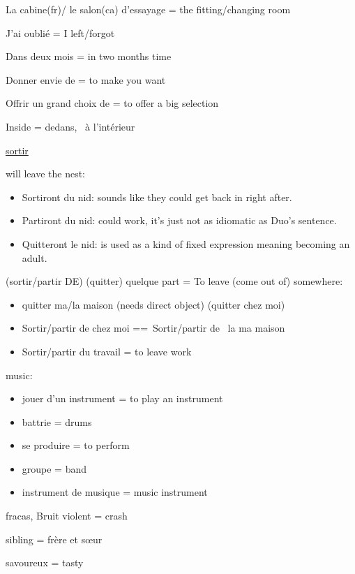 La cabine(fr)/ le salon(ca) d'essayage = the fitting/changing room~

J'ai oublié = I left/forgot~

Dans deux mois = in two months time

Donner envie de = to make you want~

Offrir un grand choix de = to offer a big selection~

Inside = dedans,~ à l'intérieur~

\href{https://www.larousse.fr/dictionnaires/francais/sortir/73545}{sortir}

will leave the nest:

\begin{itemize}
\item
  {Sortiront} du nid: sounds like they {could get back in right after}.
\item
  {Partiront} du nid: could work, it's just not as idiomatic as Duo's
  sentence.
\item
  {Quitteront} le nid: is used as a kind of fixed expression meaning
  {becoming an adult}.
\end{itemize}

{(sortir/partir DE) (quitter)} {quelque part = To leave (come out of)
somewhere:}

\begin{itemize}
\item
  {quitter ma/la maison} {(needs direct object}{) (}{quitter} {chez
  moi}{)}
\item
  {Sortir/partir de chez moi ==~}{Sortir/partir de~} {la} {ma} {maison}
\item
  {Sortir/partir du travail = to leave work~}
\end{itemize}

{music:}

\begin{itemize}
\item
  {jouer d'un instrument = to play an instrument}
\item
  {battrie = drums}
\item
  {se produire = to perform}
\item
  {groupe = band}
\item
  {instrument de musique = music instrument}
\end{itemize}

{fracas, Bruit violent = crash}

{sibling = frère et sœur}

{savoureux = tasty}

